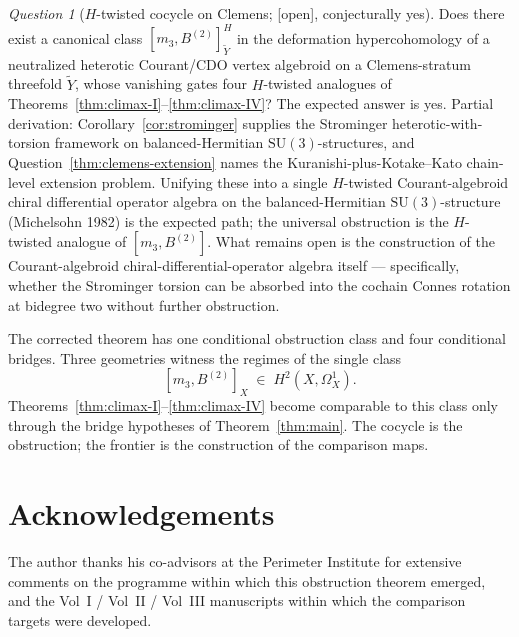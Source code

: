 \documentclass[11pt,reqno]{amsart}
\theoremstyle{plain}
\theoremstyle{definition}
\theoremstyle{remark}
\newtheorem{question}[theorem]{Question}
\providecommand{\ClaimStatusOpen}{\textnormal{[open]}}
\begin{document}
\begin{question}[$H$-twisted cocycle on Clemens; \ClaimStatusOpen, conjecturally yes]
Does there exist a canonical class $[m_3, B^{(2)}]^H_{\tilde Y}$ in the deformation hypercohomology of a neutralized heterotic Courant/CDO vertex algebroid on a Clemens-stratum threefold $\tilde Y$, whose vanishing gates four $H$-twisted analogues of Theorems~\ref{thm:climax-I}--\ref{thm:climax-IV}? The expected answer is yes. Partial derivation: Corollary~\ref{cor:strominger} supplies the Strominger heterotic-with-torsion framework on balanced-Hermitian $\mathrm{SU}(3)$-structures, and Question~\ref{thm:clemens-extension} names the Kuranishi-plus-Kotake--Kato chain-level extension problem. Unifying these into a single $H$-twisted Courant-algebroid chiral differential operator algebra on the balanced-Hermitian $\mathrm{SU}(3)$-structure (Michelsohn 1982) is the expected path; the universal obstruction is the $H$-twisted analogue of $[m_3, B^{(2)}]$. What remains open is the construction of the Courant-algebroid chiral-differential-operator algebra itself --- specifically, whether the Strominger torsion can be absorbed into the cochain Connes rotation at bidegree two without further obstruction.
\end{question}

\medskip

The corrected theorem has one conditional obstruction class and four conditional bridges. Three geometries witness the regimes of the single class
\[
  [m_3, B^{(2)}]_X \;\in\; H^2(X, \Omega^1_X).
\]
Theorems~\ref{thm:climax-I}--\ref{thm:climax-IV} become comparable to this class only through the bridge hypotheses of Theorem~\ref{thm:main}. The cocycle is the obstruction; the frontier is the construction of the comparison maps.

\appendix





\section*{Acknowledgements}
The author thanks his co-advisors at the Perimeter Institute for extensive comments on the programme within which this obstruction theorem emerged, and the Vol~I / Vol~II / Vol~III manuscripts within which the comparison targets were developed.
\end{document}

